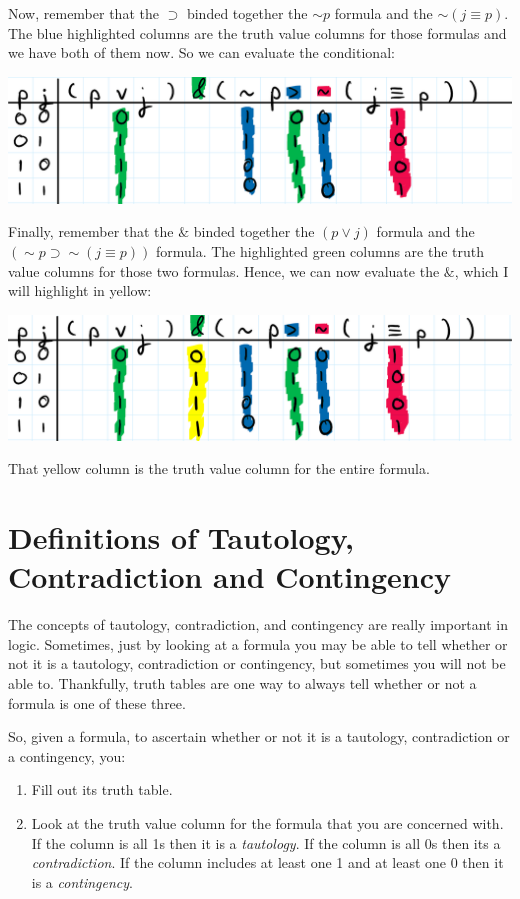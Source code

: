\documentclass[
]{book}
\providecommand{\tightlist}{%
  \setlength{\itemsep}{0pt}\setlength{\parskip}{0pt}}
\begin{document}
Now, remember that the \(\supset\) binded together the \(\sim p\) formula and the \(\sim (j \equiv p)\). The blue highlighted columns are the truth value columns for those formulas and we have both of them now. So we can evaluate the conditional:

\includegraphics{Pictures/Week4Picture10.png}

Finally, remember that the \(\&\) binded together the \((p \lor j)\) formula and the \((\sim p \supset \sim (j \equiv p))\) formula. The highlighted green columns are the truth value columns for those two formulas. Hence, we can now evaluate the \(\&\), which I will highlight in yellow:

\includegraphics{Pictures/Week4Picture11.png}

That yellow column is the truth value column for the entire formula.

\hypertarget{definitions-of-tautology-contradiction-and-contingency}{%
\section{Definitions of Tautology, Contradiction and Contingency}\label{definitions-of-tautology-contradiction-and-contingency}}

The concepts of tautology, contradiction, and contingency are really important in logic. Sometimes, just by looking at a formula you may be able to tell whether or not it is a tautology, contradiction or contingency, but sometimes you will not be able to. Thankfully, truth tables are one way to always tell whether or not a formula is one of these three.

So, given a formula, to ascertain whether or not it is a tautology, contradiction or a contingency, you:

\begin{enumerate}
\def\labelenumi{\arabic{enumi}.}
\tightlist
\item
  Fill out its truth table.
\item
  Look at the truth value column for the formula that you are concerned with. If the column is all 1s then it is a \emph{tautology}. If the column is all 0s then its a \emph{contradiction}. If the column includes at least one 1 and at least one 0 then it is a \emph{contingency}.
\end{enumerate}
\end{document}
